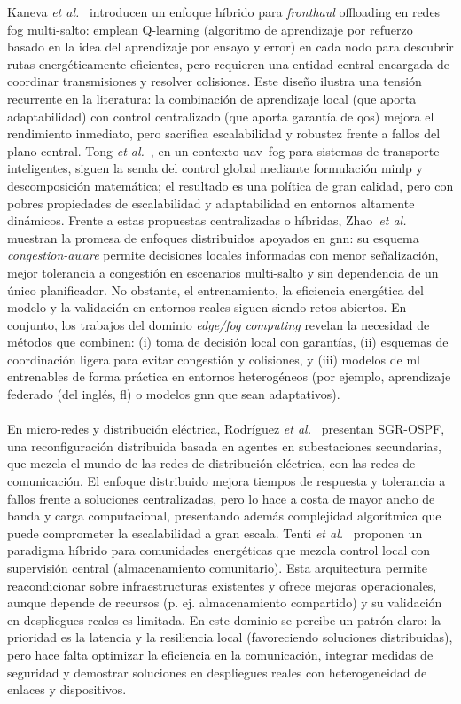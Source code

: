 Kaneva \textit{et al.}~\cite{Kaneva21} introducen un enfoque híbrido para \textit{fronthaul} offloading en redes fog multi-salto: emplean Q-learning (algoritmo de aprendizaje por refuerzo basado en la idea del aprendizaje por ensayo y error) en cada nodo para descubrir rutas energéticamente eficientes, pero requieren una entidad central encargada de coordinar transmisiones y resolver colisiones. Este diseño ilustra una tensión recurrente en la literatura: la combinación de aprendizaje local (que aporta adaptabilidad) con control centralizado (que aporta garantía de \gls{qos}) mejora el rendimiento inmediato, pero sacrifica escalabilidad y robustez frente a fallos del plano central. Tong \textit{et al.}~\cite{Tong22}, en un contexto \gls{uav}–fog para sistemas de transporte inteligentes, siguen la senda del control global mediante formulación \gls{minlp} y descomposición matemática; el resultado es una política de gran calidad, pero con pobres propiedades de escalabilidad y adaptabilidad en entornos altamente dinámicos. Frente a estas propuestas centralizadas o híbridas, Zhao~\textit{et al.}~\cite{Zhao24Z} muestran la promesa de enfoques distribuidos apoyados en \gls{gnn}: su esquema \textit{congestion-aware} permite decisiones locales informadas con menor señalización, mejor tolerancia a congestión en escenarios multi-salto y sin dependencia de un único planificador. No obstante, el entrenamiento, la eficiencia energética del modelo y la validación en entornos reales siguen siendo retos abiertos. En conjunto, los trabajos del dominio \textit{edge/fog computing} revelan la necesidad de métodos que combinen: (i) toma de decisión local con garantías, (ii) esquemas de coordinación ligera para evitar congestión y colisiones, y (iii) modelos de \gls{ml} entrenables de forma práctica en entornos heterogéneos (por ejemplo, aprendizaje federado (del inglés, \gls{fl}) o modelos \gls{gnn} que sean adaptativos).\\
\\
En micro-redes y distribución eléctrica, Rodríguez \textit{et al.}~\cite{Rodriguez16} presentan SGR-OSPF, una reconfiguración distribuida basada en agentes en subestaciones secundarias, que mezcla el mundo de las redes de distribución eléctrica, con las redes de comunicación. El enfoque distribuido mejora tiempos de respuesta y tolerancia a fallos frente a soluciones centralizadas, pero lo hace a costa de mayor ancho de banda y carga computacional, presentando además complejidad algorítmica que puede comprometer la escalabilidad a gran escala. Tenti \textit{et al.}~\cite{Tenti23} proponen un paradigma híbrido para comunidades energéticas que mezcla control local con supervisión central (almacenamiento comunitario). Esta arquitectura permite reacondicionar sobre infraestructuras existentes y ofrece mejoras operacionales, aunque depende de recursos (p. ej. almacenamiento compartido) y su validación en despliegues reales es limitada. En este dominio se percibe un patrón claro: la prioridad es la latencia y la resiliencia local (favoreciendo soluciones distribuidas), pero hace falta optimizar la eficiencia en la comunicación, integrar medidas de seguridad y demostrar soluciones en despliegues reales con heterogeneidad de enlaces y dispositivos.\\
